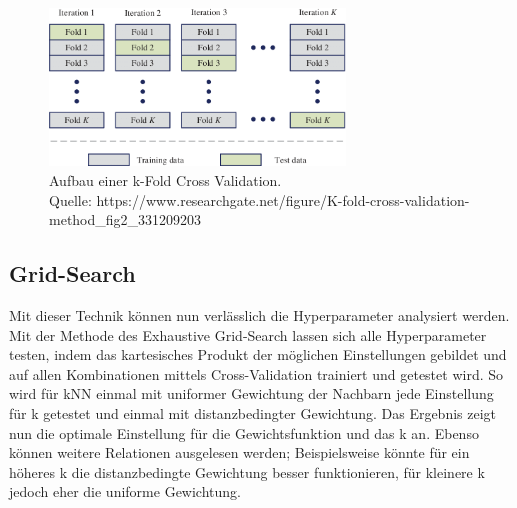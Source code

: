 \begin{figure}
    \centering
    \includegraphics[width=0.7\textwidth]{res/theory-cv}
    \caption{Aufbau einer k-Fold Cross Validation.\\ Quelle: https://www.researchgate.net/figure/K-fold-cross-validation-method\_fig2\_331209203}
    \label{fig:theory-cv}
\end{figure}

\subsection*{Grid-Search}

Mit dieser Technik können nun verlässlich die Hyperparameter analysiert werden. Mit der Methode des Exhaustive
 Grid-Search lassen sich alle Hyperparameter testen, indem das kartesisches Produkt der möglichen Einstellungen
 gebildet und auf allen Kombinationen mittels Cross-Validation trainiert und getestet wird. So wird für kNN einmal
 mit uniformer Gewichtung der Nachbarn jede Einstellung für k getestet und einmal mit distanzbedingter Gewichtung.
 Das Ergebnis zeigt nun die optimale Einstellung für die Gewichtsfunktion und das k an. Ebenso können weitere
 Relationen ausgelesen werden; Beispielsweise könnte für ein höheres k die distanzbedingte Gewichtung besser
 funktionieren, für kleinere k jedoch eher die uniforme Gewichtung.
